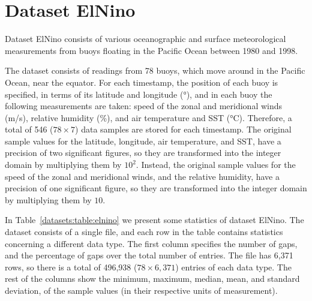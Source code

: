 
\clearpage
\section{Dataset ElNino}
\label{datasets:elnino}

Dataset ElNino \cite{dataset:elnino} consists of various oceanographic and surface meteorological measurements from buoys floating in the Pacific Ocean between 1980 and 1998. \TAODef


The dataset consists of readings from 78 buoys, which move around in the Pacific Ocean, near the equator. For each timestamp, the position of each buoy is specified, in terms of its latitude and longitude (°), and in each buoy the following measurements are taken: speed of the zonal and meridional winds (m/s), relative humidity (\%), and air temperature and SST (°C). Therefore, a total of 546 ($78\times7$) data samples are stored for each timestamp. The original sample values for the latitude, longitude, air temperature, and SST, have a precision of two significant figures, so they are transformed into the integer domain by multiplying them by $10^2$. Instead, the original sample values for the speed of the zonal and meridional winds, and the relative humidity, have a precision of one significant figure, so they are transformed into the integer domain by multiplying them by $10$.


In Table~\ref{datasets:table:elnino} we present some statistics of dataset ElNino. The dataset consists of a single file, and each row in the table contains statistics concerning a different data type. The first column specifies the number of gaps, and the percentage of gaps over the total number of entries. The file has 6,371 rows, so there is a total of 496,938 ($78\times6,371$) entries of each data type. The rest of the columns show the minimum, maximum, median, mean, and standard deviation, of the sample values (in their respective units of measurement).




